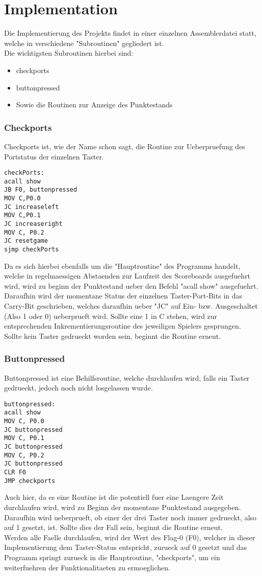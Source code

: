 \chapter{Implementation}
Die Implementierung des Projekts findet in einer einzelnen Assemblerdatei statt, welche in verschiedene "Subroutinen" gegliedert ist.\\
Die wichtigsten Subroutinen hierbei sind:
\begin{itemize}
	\item checkports
	\item buttonpressed
	\item Sowie die Routinen zur Anzeige des Punktestands
\end{itemize}

\subsection{Checkports}
Checkports ist, wie der Name schon sagt, die Routine zur Ueberpruefung des Portstatus der einzelnen Taster.
\begin{lstlisting}
checkPorts:
acall show
JB F0, buttonpressed
MOV C,P0.0
JC increaseleft
MOV C,P0.1
JC increaseright
MOV C, P0.2
JC resetgame
sjmp checkPorts
\end{lstlisting}
Da es sich hierbei ebenfalls um die "Hauptroutine" des Programms handelt, welche in regelmaessigen Abstaenden zur Laufzeit des Scoreboards ausgefuehrt wird, wird zu beginn der Punktestand ueber den Befehl "acall show" ausgefuehrt.\\
Daraufhin wird der momentane Status der einzelnen Taster-Port-Bits in das Carry-Bit geschrieben, welches daraufhin ueber "JC" auf Ein- bzw. Ausgeschaltet (Also 1 oder 0) ueberprueft wird. Sollte eine 1 in C stehen, wird zur entsprechenden Inkrementierungsroutine des jeweiligen Spielers gesprungen.\\
Sollte kein Taster gedrueckt worden sein, beginnt die Routine erneut.

\subsection{Buttonpressed}
Buttonpressed ist eine Behilfsroutine, welche durchlaufen wird, falls ein Taster gedrueckt, jedoch noch nicht losgelassen wurde.
\begin{lstlisting}
buttonpressed:
acall show
MOV C, P0.0
JC buttonpressed
MOV C, P0.1
JC buttonpressed
MOV C, P0.2
JC buttonpressed
CLR F0
JMP checkports
\end{lstlisting}
Auch hier, da es eine Routine ist die potentiell fuer eine Laengere Zeit durchlaufen wird, wird zu Beginn der momentane Punktestand ausgegeben. Daraufhin wird ueberprueft, ob einer der drei Taster noch immer gedrueckt, also auf 1 gesetzt, ist. Sollte dies der Fall sein, beginnt die Routine erneut.\\
Werden alle Faelle durchlaufen, wird der Wert des Flag-0 (F0), welcher in dieser Implementierung dem Taster-Status entspricht, zurueck auf 0 gesetzt und das Programm springt zurueck in die Hauptroutine, "checkports", um ein weiterfuehren der Funktionalitaeten zu ermoeglichen.

